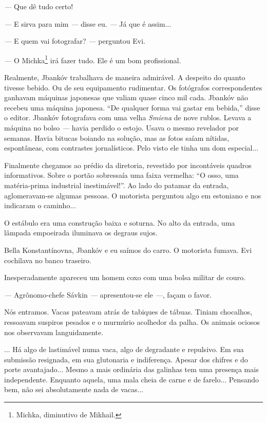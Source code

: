 \emph{---} Que dê tudo certo!

\emph{---} E sirva para mim \emph{---} disse eu. \emph{---} Já que é
assim...

\emph{---} E quem vai fotografar? \emph{---} perguntou Evi.

\emph{---} O Michka\footnote{Michka, diminutivo de Mikhail.} irá fazer
tudo. Ele é um bom profissional.

Realmente, Jbankóv trabalhava de maneira admirável. A despeito do quanto
tivesse bebido. Ou de seu equipamento rudimentar. Os fotógrafos
correspondentes ganhavam máquinas japonesas que valiam quase cinco mil
cada. Jbankóv não recebeu uma máquina japonesa. ``De qualquer forma vai
gastar em bebida,'' disse o editor. Jbankóv fotografava com uma velha
\emph{Smiena} de nove rublos. Levava a máquina no bolso \emph{---} havia
perdido o estojo. Usava o mesmo revelador por semanas. Havia bitucas
boiando na solução, mas as fotos saíam nítidas, espontâneas, com
contrastes jornalísticos. Pelo visto ele tinha um dom especial...

Finalmente chegamos ao prédio da diretoria, revestido por incontáveis
quadros informativos. Sobre o portão sobressaía uma faixa vermelha: ``O
osso, uma matéria-prima industrial inestimável!''. Ao lado do patamar da
entrada, aglomeravam-se algumas pessoas. O motorista perguntou algo em
estoniano e nos indicaram o caminho...

O estábulo era uma construção baixa e soturna. No alto da entrada, uma
lâmpada empoeirada iluminava os degraus sujos.

Bella Konstantínovna, Jbankóv e eu saímos do carro. O motorista fumava.
Evi cochilava no banco traseiro.

Inesperadamente apareceu um homem coxo com uma bolsa militar de couro.

\emph{---} Agrônomo-chefe Sávkin \emph{---} apresentou-se ele
\emph{---}, façam o favor.

Nós entramos. Vacas pateavam atrás de tabiques de tábuas. Tiniam
chocalhos, ressoavam suspiros pesados e o murmúrio acolhedor da palha.
Os animais ociosos nos observavam languidamente.

... Há algo de lastimável numa vaca, algo de degradante e repulsivo. Em
sua submissão resignada, em sua glutonaria e indiferença. Apesar dos
chifres e do porte avantajado... Mesmo a mais ordinária das galinhas tem
uma presença mais independente. Enquanto aquela, uma mala cheia de carne
e de farelo... Pensando bem, não sei absolutamente nada de vacas...

